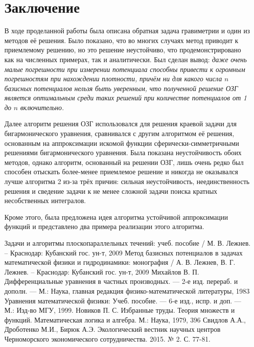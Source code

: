 \documentclass[a4paper]{article}
\begin{document}
\section*{Заключение}
В ходе проделанной работы была описана обратная задача гравиметрии и один из методов её решения. Было показано,
что во многих случаях метод приводит к приемлемому решению, но это решение неустойчиво, что продемонстрировано как на численных примерах,
так и аналитически. Был сделан вывод:
{\it даже очень малые погрешности при измерении потенциала способны привести к огромным погрешностям при нахождении плотности, причём ни для какого числа $n$ базисных потенциалов нельзя быть уверенным, что полученной решение ОЗГ является оптимальным среди таких решений при количестве потенциалов от 1 до $n$ включительно.}

Далее алгоритм решения ОЗГ использовался для решения краевой задачи для бигармонического уравнения, сравнивался с другим алгоритмом её решения,
основанным на аппроксимации искомой функции сферически-симметричными решениями бигармонического уравнения.
Была показана неустойчивость обоих методов, однако алгоритм, основанный на решении ОЗГ, лишь очень редко был способен отыскать более-менее приемлемое решение и никогда не оказывался лучше алгоритма 2 из-за трёх причин: сильная неустойчивость, неединственность решения и сведение задачи к не менее сложной задачи поиска кратных несобственных интегралов.  

Кроме этого, была предложена идея алгоритма устойчивой аппроксимации функций и представлено два примера реализации этого алгоритма.

\begin{thebibliography}{6} 
  Задачи и алгоритмы плоскопараллельных течений: учеб. пособие / М. В. Лежнев. -- Краснодар: Кубанский гос. ун-т, 2009
  Метод базисных потенциалов в задачах математической физики и гидродинамики: монография / А. В. Лежнев, В. Г. Лежнев. -- Краснодар: Кубанский гос. ун-т, 2009
  Михайлов В. П. Дифференциальные уравнения в частных производных. --- 2-е изд. перераб. и дополн. --- М.: Наука, главная редакция физико-математической литературы, 1983
  Уравнения математической физики: Учеб. пособие. --- 6-е изд., испр. и доп. --- М.: Изд-во МГУ, 1999.
Новиков П. С. Избранные труды. Теория множеств и функций. Математическая логика и алгебра. М.: Наука, 1979, 396 
Свидлов А.А., Дроботенко М.И., Бирюк А.Э.
Экологический вестник научных центров Черноморского экономического сотрудничества. 2015. № 2. С. 77-81.

\end{thebibliography}
\end{document}
